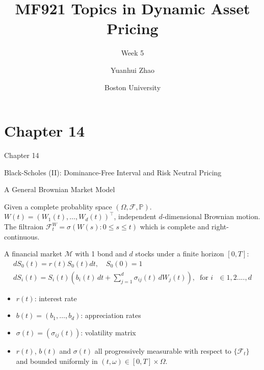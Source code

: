 \documentclass{beamer}
\title{MF921 Topics in Dynamic Asset Pricing}
\subtitle{Week 5}
\author{Yuanhui Zhao}
\date{Boston University}
\begin{document}
\frame{\titlepage}

\section{Chapter 14}
\begin{frame}{Chapter 14}

    \begin{center}
        \par Black-Scholes (II): Dominance-Free Interval and Risk Neutral Pricing
    \end{center}
    
\end{frame}

\begin{frame}{A General Brownian Market Model}

    {\footnotesize \footnotesize
    \par Given a complete probablity space \( (\Omega, \mathcal{F}, \mathbb{P}) \).
    \( W(t) = (W_1(t), \ldots, W_d(t))^\top \), independent \( d \)-dimensional Brownian motion. The filtraion 
    $\mathcal{F}_t^W = \sigma(W(s) : 0 \leq s \leq t)$ which is complete and right-continuous.
    \vspace{1em} 
    \par A financial market $\mathcal{M}$ with 1 bond and $d$ stocks under a finite horizon $[0,T]$:
    \begin{gather*}
    dS_0(t) = r(t)S_0(t)  dt, \quad S_0(0) = 1 \\
    dS_i(t) = S_i(t)\left(b_i(t)\,dt + \sum_{j=1}^d \sigma_{ij}(t)\,dW_j(t)\right),\;\;\text{for $i$ $\in 1,2....,d$}
    \end{gather*}
    \begin{itemize}
        \item \( r(t) \): interest rate
        \item  \( b(t) = (b_1, \ldots, b_d) \): appreciation rates
        \item \( \sigma(t) = (\sigma_{ij}(t)) \): volatility matrix
        \item \( r(t) \), \(b(t) \) and \( \sigma(t)\) all progressively measurable
         with respect to $\{\mathcal{F}_t\}$ and bounded uniformly in $(t,\omega) \in [0,T] \times \Omega$.
    \end{itemize}
    }   
\end{frame}
\end{document}
